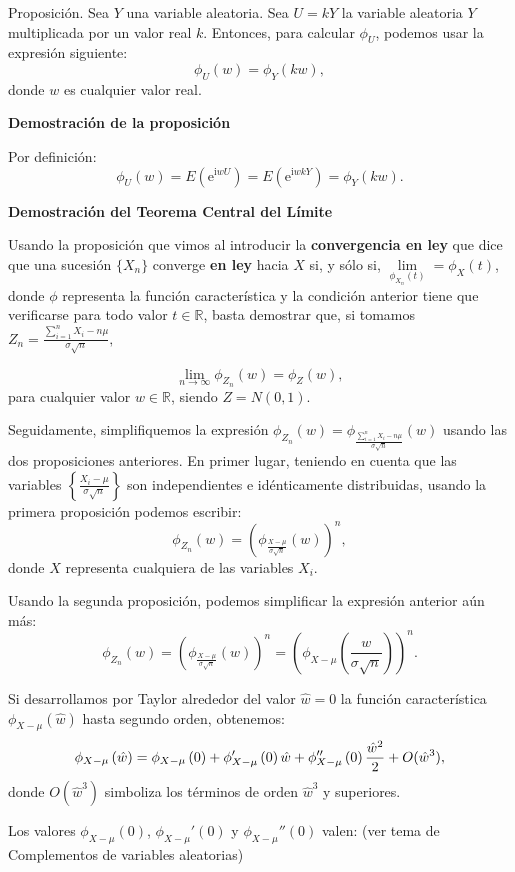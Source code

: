 \documentclass[]{book}
\begin{document}
 Proposición.
Sea \(Y\) una variable aleatoria. Sea \(U=kY\) la variable aleatoria \(Y\) multiplicada por un valor real \(k\). Entonces, para calcular \(\phi_{U}\), podemos usar la expresión siguiente:
\[
\phi_{U}(w)=\phi_Y(kw),
\]
donde \(w\) es cualquier valor real.

\textbf{Demostración de la proposición}

Por definición:
\[
\phi_{U}(w)=E\left(\mathrm{e}^{\mathrm{i} w U}\right) = E\left(\mathrm{e}^{\mathrm{i} w k Y}\right)=\phi_Y(kw).
\]

\textbf{Demostración del Teorema Central del Límite}

Usando la proposición que vimos al introducir la \textbf{convergencia en ley} que dice que una sucesión \(\{X_n\}\) converge \textbf{en ley} hacia \(X\) si, y sólo si, \(\lim\limits_{\phi_{X_n}(t)}=\phi_{X}(t)\), donde \(\phi\) representa la función característica y la condición anterior tiene que verificarse para todo valor \(t\in\mathbb{R}\), basta demostrar que, si tomamos
\(Z_n = \frac{\sum\limits_{i=1}^n X_i-n\mu}{\sigma\sqrt{n}},\)

\[
\lim_{n\to \infty}\phi_{Z_n}(w)=\phi_Z(w),
\]
para cualquier valor \(w\in\mathbb{R}\), siendo \(Z=N(0,1)\).

Seguidamente, simplifiquemos la expresión \(\phi_{Z_n}(w)=\phi_{\frac{\sum\limits_{i=1}^n X_i-n\mu}{\sigma\sqrt{n}}}(w)\) usando las dos proposiciones anteriores. En primer lugar, teniendo en cuenta que las variables \(\left\{\frac{X_i-\mu}{\sigma\sqrt{n}}\right\}\) son independientes e idénticamente distribuidas, usando la primera proposición podemos escribir:
\[
\phi_{Z_n}(w) = \left(\phi_{\frac{X-\mu}{\sigma\sqrt{n}}}(w)\right)^n,
\]
donde \(X\) representa cualquiera de las variables \(X_i\).

Usando la segunda proposición, podemos simplificar la expresión anterior aún más:
\[
\phi_{Z_n}(w) = \left(\phi_{\frac{X-\mu}{\sigma\sqrt{n}}}(w)\right)^n = \left(\phi_{X-\mu}\left(\frac{w}{\sigma\sqrt{n}}\right)\right)^n.
\]

Si desarrollamos por Taylor alrededor del valor \(\hat{w}=0\) la función característica \(\phi_{X-\mu}\left(\hat{w}\right)\) hasta segundo orden, obtenemos:
\[
\scriptsize{
\phi_{X-\mu}\left(\hat{w}\right) = \phi_{X-\mu}\left(0\right)+ \phi_{X-\mu}'\left(0\right) \hat{w}+ \phi_{X-\mu}''\left(0\right)\frac{\hat{w}^2}{2}+O(\hat{w}^3),
}
\]
donde \(O(\hat{w}^3)\) simboliza los términos de orden \(\hat{w}^3\) y superiores.

Los valores \(\phi_{X-\mu}\left(0\right)\), \(\phi_{X-\mu}'\left(0\right)\) y \(\phi_{X-\mu}''\left(0\right)\) valen: (ver tema de Complementos de variables aleatorias)
\end{document}
